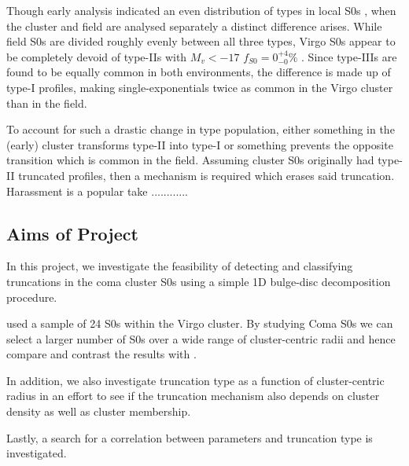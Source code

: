 Though early analysis indicated an even distribution of types in local S0s \citep{gutierrez_outer_2011}, when the cluster and field are analysed separately a distinct difference arises. While field S0s are divided roughly evenly between all three types, Virgo S0s appear to be completely devoid of type-IIs with $M_v < -17$ $f_{S0} = 0_{-0}^{+4}\%$ \citep{erwin_strong_2012}. Since type-IIIs are found to be equally common in both environments, the difference is made up of type-I profiles, making single-exponentials twice as common in the Virgo cluster than in the field. 

To account for such a drastic change in type population, either something in the (early) cluster transforms type-II into type-I or something prevents the opposite transition which is common in the field. Assuming cluster S0s originally had type-II truncated profiles, then a mechanism is required which erases said truncation. Harassment is a popular take ............

\subsection{Aims of Project}
In this project, we investigate the feasibility of detecting and classifying truncations in the coma cluster S0s using a simple 1D bulge-disc decomposition procedure. 

\citet{erwin_strong_2012} used a sample of 24 S0s within the Virgo cluster. By studying Coma S0s we can select a larger number of S0s over a wide range of cluster-centric radii and hence compare and contrast the results with \citet{erwin_strong_2012}. 

In addition, we also investigate truncation type as a function of cluster-centric radius in an effort to see if the truncation mechanism also depends on cluster density as well as cluster membership.

Lastly, a search for a correlation between \sersic parameters and truncation type is investigated.

